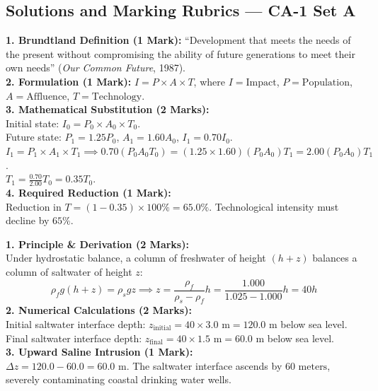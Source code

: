 \newpage
\subsection*{Solutions and Marking Rubrics --- CA-1 Set A}

\begin{solutionbox}
\textbf{1. Brundtland Definition (1 Mark):} ``Development that meets the needs of the present without compromising the ability of future generations to meet their own needs'' (\textit{Our Common Future}, 1987).\\
\textbf{2. Formulation (1 Mark):} $I = P \times A \times T$, where $I = \text{Impact}$, $P = \text{Population}$, $A = \text{Affluence}$, $T = \text{Technology}$.\\
\textbf{3. Mathematical Substitution (2 Marks):}\\
Initial state: $I_0 = P_0 \times A_0 \times T_0$.\\
Future state: $P_1 = 1.25 P_0$, $A_1 = 1.60 A_0$, $I_1 = 0.70 I_0$.\\
$I_1 = P_1 \times A_1 \times T_1 \implies 0.70 (P_0 A_0 T_0) = (1.25 \times 1.60) (P_0 A_0) T_1 = 2.00 (P_0 A_0) T_1$.\\
$T_1 = \frac{0.70}{2.00} T_0 = 0.35 T_0$.\\
\textbf{4. Required Reduction (1 Mark):}\\
$\text{Reduction in } T = (1 - 0.35) \times 100\% = 65.0\%$. Technological intensity must decline by $65\%$.
\end{solutionbox}

\begin{solutionbox}
\textbf{1. Principle \& Derivation (2 Marks):}\\
Under hydrostatic balance, a column of freshwater of height $(h + z)$ balances a column of saltwater of height $z$:
\[
\rho_f g (h + z) = \rho_s g z \implies z = \frac{\rho_f}{\rho_s - \rho_f} h = \frac{1.000}{1.025 - 1.000} h = 40 h
\]
\textbf{2. Numerical Calculations (2 Marks):}\\
Initial saltwater interface depth: $z_{\text{initial}} = 40 \times 3.0\text{ m} = 120.0\text{ m}$ below sea level.\\
Final saltwater interface depth: $z_{\text{final}} = 40 \times 1.5\text{ m} = 60.0\text{ m}$ below sea level.\\
\textbf{3. Upward Saline Intrusion (1 Mark):}\\
$\Delta z = 120.0 - 60.0 = 60.0\text{ m}$. The saltwater interface ascends by $60\text{ meters}$, severely contaminating coastal drinking water wells.
\end{solutionbox}

